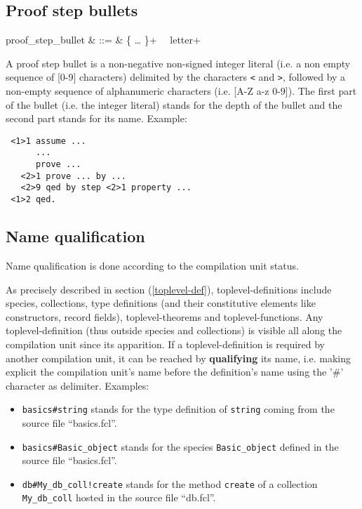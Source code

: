 \subsection{Proof step bullets}
\begin{syntax}
proof\_step\_bullet & ::= &
   \terminal{<} \{  \ldots {} \}+\ \terminal{>}
   \ letter+
\end{syntax}

A proof step bullet is a non-negative non-signed integer literal
(i.e. a non empty sequence of [0-9] characters) delimited by the
characters {\tt <} and {\tt >}, followed by a non-empty sequence of
alphanumeric characters (i.e. [A-Z a-z 0-9]). 
The first part of the bullet (i.e. the integer literal) stands for the
depth of the bullet and the second part stands for its name. Example:
{\scriptsize
\begin{lstlisting}
 <1>1 assume ...
      ...
      prove ...
   <2>1 prove ... by ...
   <2>9 qed by step <2>1 property ...
 <1>2 qed.
\end{lstlisting}
}



\subsection{Name qualification}
\label{qualified-name}
 

Name qualification is done according to the
compilation unit status. 


As precisely described in section (\ref{toplevel-def}), 
toplevel-definitions include species, collections, type definitions
(and their constitutive elements like constructors, record fields),
toplevel-theorems and toplevel-functions.  Any toplevel-definition (thus outside species
and collections) is visible all along the compilation unit since its
apparition.
If a toplevel-definition is required by another compilation unit, it can
be reached by {\bf qualifying} its name, i.e. making explicit the
compilation unit's name before the definition's name using the '\#'
character as delimiter. Examples:

\begin{itemize}
  \item {\tt basics\#string} stands for the type definition of
    {\tt string} coming from the source file ``basics.fcl''.
  \item {\tt  basics\#Basic\_object} stands for the species
    {\tt Basic\_object} defined in the source file ``basics.fcl''.
  \item {\tt db\#My\_db\_coll!create} stands for the method
    {\tt create} of a collection {\tt My\_db\_coll} hosted in the
    source file ``db.fcl''.
\end{itemize}

